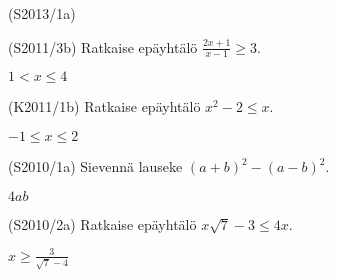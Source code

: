 \begin{tehtava}
(S2013/1a) \\
\begin{alakohdat}
\end{alakohdat}

\end{tehtava}


\begin{tehtava}
  (S2011/3b) Ratkaise epäyhtälö $\frac{2x+1}{x-1} \geq 3$.
\begin{vastaus}
$1<x \leq 4$
\end{vastaus}
\end{tehtava}

\begin{tehtava}
(K2011/1b) Ratkaise epäyhtälö $x^2-2 \leq x$.
\begin{vastaus}
$-1 \leq x \leq 2$
\end{vastaus}
\end{tehtava}

\begin{tehtava}
(S2010/1a) Sievennä lauseke $(a+b)^2-(a-b)^2$.
\begin{vastaus}
$4ab$
\end{vastaus}
\end{tehtava}

\begin{tehtava}
(S2010/2a) Ratkaise epäyhtälö $x\sqrt{7}-3 \leq 4x$.
\begin{vastaus}
$x \geq \frac{3}{\sqrt{7}-4}$
\end{vastaus}
\end{tehtava}

